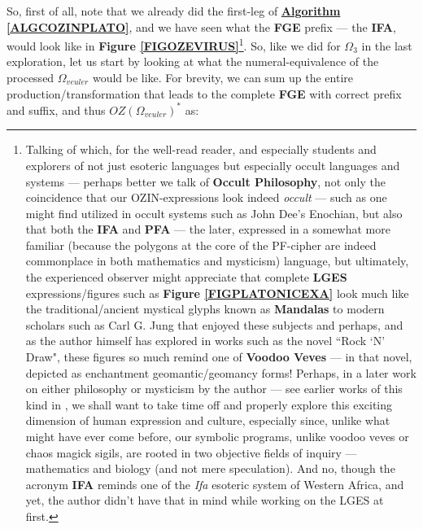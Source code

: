 \documentclass[a4paper, 18pt]{book} %
\begin{document}
So, first of all, note that we already did the first-leg of \textbf{\hyperref[ALGCOZINPLATO]{Algorithm \ref{ALGCOZINPLATO}}}, and we have seen what the \textbf{FGE} prefix --- the \textbf{IFA}, would look like in \textbf{Figure \ref{FIGOZEVIRUS}}\footnote{Talking of which, for the well-read reader, and especially students and explorers of not just esoteric languages but especially occult languages and systems --- perhaps better we talk of \textbf{Occult Philosophy}\cite{agrippa2014occult}, not only the coincidence that our OZIN-expressions look indeed \textit{occult} --- such as one might find utilized in occult systems such as John Dee's Enochian\cite{lutalo2025unraveling}, but also that both the \textbf{IFA} and \textbf{PFA} --- the later, expressed in a somewhat more familiar (because the polygons at the core of the PF-cipher are indeed commonplace in both mathematics and mysticism) language, but ultimately, the experienced observer might appreciate that complete \textbf{LGES} expressions/figures such as \textbf{Figure \ref{FIGPLATONICEXA}} look much like the traditional/ancient mystical glyphs known as \textbf{Mandalas} to modern scholars such as Carl G. Jung that enjoyed these subjects\cite{jung1964symbols} and perhaps, and as the author himself has explored in works such as the novel ``Rock `N' Draw"\cite{lutalo2025rock}, these figures so much remind one of \textbf{Voodoo Veves} --- in that novel, depicted as enchantment geomantic/geomancy forms! Perhaps, in a later work on either philosophy or mysticism by the author --- see earlier works of this kind in \cite{lutalo2025concerning_trans}, we shall want to take time off and properly explore this exciting dimension of human expression and culture, especially since, unlike what might have ever come before, our symbolic programs, unlike voodoo veves or chaos magick sigils, are rooted in two objective fields of inquiry --- mathematics and biology (and not mere speculation). And no, though the acronym \textbf{IFA} reminds one of the \textit{Ifa} esoteric system of  Western Africa, and yet, the author didn't have that in mind while working on the LGES at first.}. So, like we did for $\Omega_{3}$ in the last exploration, let us start by looking at what the numeral-equivalence of the processed $\Omega_{veuler}$ would be like. For brevity, we can sum up the entire production/transformation that leads to the complete \textbf{FGE} with correct prefix and suffix, and thus $\boxed{OZ(\Omega_{veuler})}^*$ as:
\end{document}
